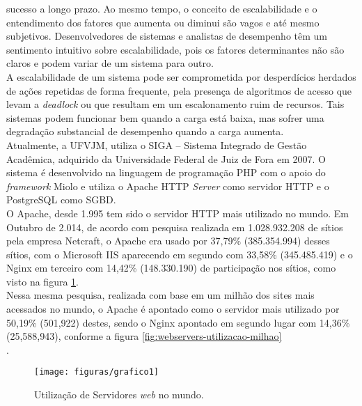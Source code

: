 sucesso a longo prazo. Ao mesmo tempo, o conceito de escalabilidade e o 
entendimento dos fatores que aumenta ou diminui são vagos e até mesmo 
subjetivos. Desenvolvedores de sistemas e analistas de desempenho têm um 
sentimento intuitivo sobre escalabilidade, pois os fatores determinantes não 
são claros e podem variar de um sistema para outro.\\
A escalabilidade de um sistema pode ser comprometida por desperdícios herdados 
de ações repetidas de forma frequente, pela presença de algoritmos de acesso 
que levam a \textit{deadlock} ou que resultam em um escalonamento ruim de 
recursos. Tais sistemas podem funcionar bem quando a carga está baixa, mas 
sofrer uma degradação substancial de desempenho quando a carga aumenta.\\
Atualmente, a UFVJM, utiliza o SIGA – Sistema Integrado de Gestão Acadêmica, 
adquirido da Universidade Federal de Juiz de Fora em 2007. O sistema é 
desenvolvido na linguagem de programação PHP com o apoio do \textit{framework} 
Miolo e utiliza o Apache HTTP \textit{Server} como servidor HTTP e o PostgreSQL 
como SGBD.\\
O Apache, desde 1.995 tem sido o servidor HTTP mais utilizado no mundo. Em 
Outubro de 2.014, de acordo com pesquisa realizada em 1.028.932.208 de sítios 
pela empresa Netcraft, o Apache era usado por 37,79\% (385.354.994) desses 
sítios, com o Microsoft IIS aparecendo em segundo com 33,58\% (345.485.419) e o 
Nginx em terceiro com 14,42\% (148.330.190) de participação nos sítios, como 
visto na figura \ref{fig:webservers-utilizacao}.\\
Nessa mesma pesquisa, realizada com base em um milhão dos sites mais acessados 
no mundo, o Apache é apontado como o servidor mais utilizado por 50,19\% 
(501,922) destes, sendo o Nginx apontado em segundo lugar com 14,36\% 
(25,588,943), conforme a figura \ref{fig:webservers-utilizacao-milhao}\\.
\begin{figure}[htb]
	\centering
	\texttt{[image: figuras/grafico1]}
	\caption{Utilização de Servidores \textit{web} no mundo.}
	\label{fig:webservers-utilizacao}
\end{figure}

